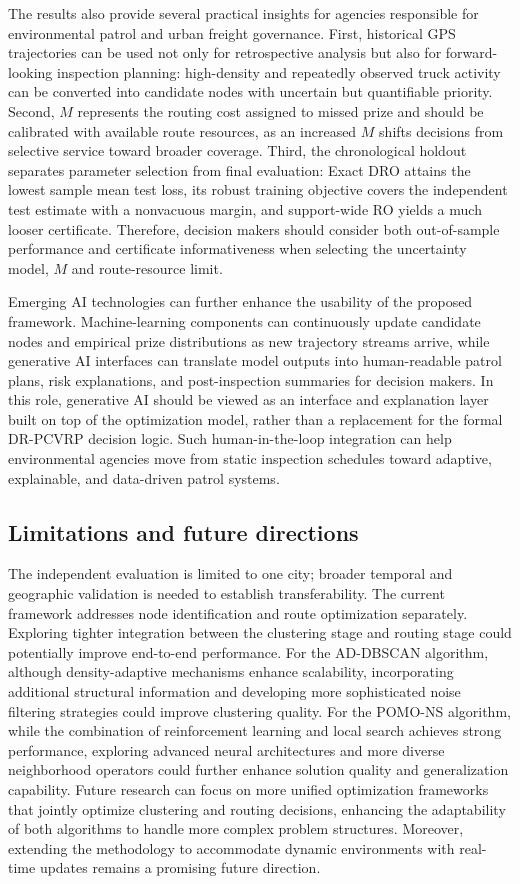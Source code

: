 \documentclass[preprint,12pt,authoryear]{elsarticle}
\theoremstyle{definition}
\begin{document}
The results also provide several practical insights for agencies responsible for environmental patrol and urban freight governance. 
First, historical GPS trajectories can be used not only for retrospective analysis but also for forward-looking inspection planning: high-density and repeatedly observed truck activity can be converted into candidate nodes with uncertain but quantifiable priority. 
Second, $M$ represents the routing cost assigned to missed prize and should be calibrated with available route resources, as an increased $M$ shifts decisions from selective service toward broader coverage. 
Third, the chronological holdout separates parameter selection from final evaluation: 
Exact DRO attains the lowest sample mean test loss, its robust training objective covers the independent test estimate with a nonvacuous margin, and support-wide RO yields a much looser certificate. 
Therefore, decision makers should consider both out-of-sample performance and certificate informativeness when selecting the uncertainty model, $M$ and route-resource limit.

Emerging AI technologies can further enhance the usability of the proposed framework. Machine-learning components can continuously update candidate nodes and empirical prize distributions as new trajectory streams arrive, while generative AI interfaces can translate model outputs into human-readable patrol plans, risk explanations, and post-inspection summaries for decision makers. In this role, generative AI should be viewed as an interface and explanation layer built on top of the optimization model, rather than a replacement for the formal DR-PCVRP decision logic. Such human-in-the-loop integration can help environmental agencies move from static inspection schedules toward adaptive, explainable, and data-driven patrol systems.


\subsection{Limitations and future directions}

The independent evaluation is limited to one city; broader temporal and geographic validation is needed to establish transferability. The current framework addresses node identification and route optimization separately. Exploring tighter integration between the clustering stage and routing stage could potentially improve end-to-end performance.  For the AD-DBSCAN algorithm, although density-adaptive mechanisms enhance scalability, incorporating additional structural information and developing more sophisticated noise filtering strategies could improve clustering quality.  For the POMO-NS algorithm, while the combination of reinforcement learning and local search achieves strong performance, exploring advanced neural architectures and more diverse neighborhood operators could further enhance solution quality and generalization capability.  Future research can focus on more unified optimization frameworks that jointly optimize clustering and routing decisions, enhancing the adaptability of both algorithms to handle more complex problem structures. Moreover, extending the methodology to accommodate dynamic environments with real-time updates remains a promising future direction.
\end{document}
